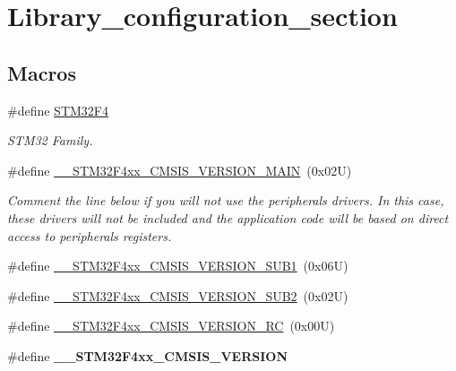 \hypertarget{group___library__configuration__section}{}\section{Library\+\_\+configuration\+\_\+section}
\label{group___library__configuration__section}
\subsection*{Macros}
\begin{DoxyCompactItemize}
\item 
\mbox{\label{group___library__configuration__section_ga84d985cb5667176091597f71ffdb9307}} 
\#define \mbox{\hyperlink{group___library__configuration__section_ga84d985cb5667176091597f71ffdb9307}{S\+T\+M32\+F4}}
\begin{DoxyCompactList}\small\item\em S\+T\+M32 Family. \end{DoxyCompactList}\item 
\#define \mbox{\hyperlink{group___library__configuration__section_gaf867da11218022a14245b854f6be6a40}{\+\_\+\+\_\+\+S\+T\+M32\+F4xx\+\_\+\+C\+M\+S\+I\+S\+\_\+\+V\+E\+R\+S\+I\+O\+N\+\_\+\+M\+A\+IN}}~(0x02\+U)
\begin{DoxyCompactList}\small\item\em Comment the line below if you will not use the peripherals drivers. In this case, these drivers will not be included and the application code will be based on direct access to peripherals registers. \end{DoxyCompactList}\item 
\#define \mbox{\hyperlink{group___library__configuration__section_ga4841e20bc5159a594936808c113ae3bc}{\+\_\+\+\_\+\+S\+T\+M32\+F4xx\+\_\+\+C\+M\+S\+I\+S\+\_\+\+V\+E\+R\+S\+I\+O\+N\+\_\+\+S\+U\+B1}}~(0x06\+U)
\item 
\#define \mbox{\hyperlink{group___library__configuration__section_ga6ccbf6336bfb67bf4daeb05eba18a5e3}{\+\_\+\+\_\+\+S\+T\+M32\+F4xx\+\_\+\+C\+M\+S\+I\+S\+\_\+\+V\+E\+R\+S\+I\+O\+N\+\_\+\+S\+U\+B2}}~(0x02\+U)
\item 
\#define \mbox{\hyperlink{group___library__configuration__section_gafbd304f122892833ce0d4daa3dc4ff13}{\+\_\+\+\_\+\+S\+T\+M32\+F4xx\+\_\+\+C\+M\+S\+I\+S\+\_\+\+V\+E\+R\+S\+I\+O\+N\+\_\+\+RC}}~(0x00\+U)
\item 
\#define {\bfseries \+\_\+\+\_\+\+S\+T\+M32\+F4xx\+\_\+\+C\+M\+S\+I\+S\+\_\+\+V\+E\+R\+S\+I\+ON}
\end{DoxyCompactItemize}


